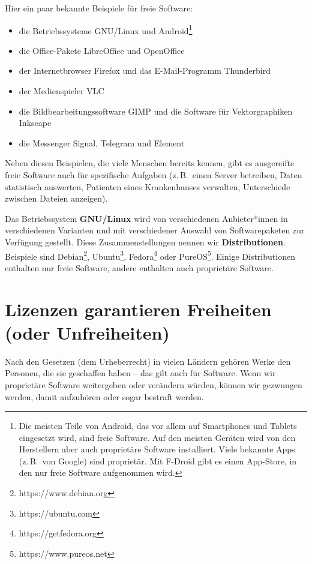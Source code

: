 \documentclass[a5paper,12pt]{scrartcl}
\begin{document}
Hier ein paar bekannte Beispiele für freie Software:
\begin{itemize}
\item die Betriebssysteme GNU/Linux und Android\footnote{Die meisten
    Teile von Android, das vor allem auf Smartphones und Tablets
    eingesetzt wird, sind freie Software. Auf den meisten Geräten wird
    von den Herstellern aber auch proprietäre Software
    installiert. Viele bekannte Apps (z.\,B.\ von Google) sind
    proprietär. Mit F-Droid gibt es einen App-Store, in den nur freie
    Software aufgenommen wird.}
\item die Office-Pakete LibreOffice und OpenOffice
\item der Internetbrowser Firefox und das E-Mail-Programm Thunderbird
\item der Medienspieler VLC
\item die Bildbearbeitungssoftware GIMP und die Software für
  Vektorgraphiken Inkscape
\item die Messenger Signal, Telegram und Element
\end{itemize}

Neben diesen Beispielen, die viele Menschen bereits kennen, gibt es
ausgereifte freie Software auch für spezifische Aufgaben (z.\,B.\
einen Server betreiben, Daten statistisch auswerten, Patienten eines
Krankenhauses verwalten, Unterschiede zwischen Dateien anzeigen).

Das Betriebssystem \textbf{GNU/Linux} wird von verschiedenen
Anbieter*innen in verschiedenen Varianten und mit verschiedener
Auswahl von Softwarepaketen zur Verfügung gestellt. Diese
Zusammenstellungen nennen wir \textbf{Distributionen}. Beispiele sind
Debian\footnote{https://www.debian.org},
Ubuntu\footnote{https://ubuntu.com},
Fedora\footnote{https://getfedora.org} oder
PureOS\footnote{https://www.pureos.net}. Einige Distributionen
enthalten nur freie Software, andere enthalten auch proprietäre
Software.


\section{Lizenzen garantieren Freiheiten (oder Unfreiheiten)}

Nach den Gesetzen (dem Urheberrecht) in vielen Ländern gehören Werke
den Personen, die sie geschaffen haben -- das gilt auch für
Software. Wenn wir proprietäre Software weitergeben oder verändern
würden, können wir gezwungen werden, damit aufzuhören oder sogar
bestraft werden.
\end{document}

